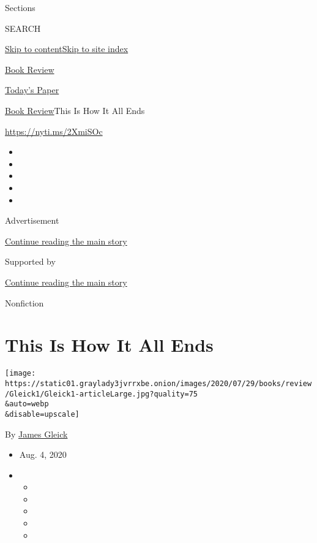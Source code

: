 Sections

SEARCH

\protect\hyperlink{site-content}{Skip to
content}\protect\hyperlink{site-index}{Skip to site index}

\href{https://www.nytimes3xbfgragh.onion/section/books/review}{Book
Review}

\href{https://myaccount.nytimes3xbfgragh.onion/auth/login?response_type=cookie\&client_id=vi}{}

\href{https://www.nytimes3xbfgragh.onion/section/todayspaper}{Today's
Paper}

\href{/section/books/review}{Book Review}\textbar{}This Is How It All
Ends

\href{https://nyti.ms/2XmiSOc}{https://nyti.ms/2XmiSOc}

\begin{itemize}
\item
\item
\item
\item
\item
\end{itemize}

Advertisement

\protect\hyperlink{after-top}{Continue reading the main story}

Supported by

\protect\hyperlink{after-sponsor}{Continue reading the main story}

Nonfiction

\hypertarget{this-is-how-it-all-ends}{%
\section{This Is How It All Ends}\label{this-is-how-it-all-ends}}

\texttt{[image: https://static01.graylady3jvrrxbe.onion/images/2020/07/29/books/review/Gleick1/Gleick1-articleLarge.jpg?quality=75\\\&auto=webp\\\&disable=upscale]}

By \href{https://www.nytimes3xbfgragh.onion/by/james-gleick}{James
Gleick}

\begin{itemize}
\item
  Aug. 4, 2020
\item
  \begin{itemize}
  \item
  \item
  \item
  \item
  \item
  \end{itemize}
\end{itemize}

